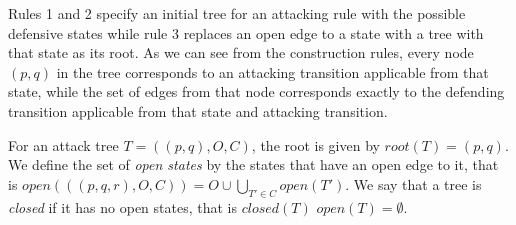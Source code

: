 \begin{definition}
  Rules 1 and 2 specify an initial tree for an attacking rule with the possible defensive
  states while rule 3 replaces an open edge to a state with a tree with that state as its
  root.
  As we can see from the construction rules, every node $(p,q)$ in the tree corresponds
  to an attacking transition applicable from that state, while the set of edges from that node
  corresponds exactly to the defending transition applicable from that state and attacking transition.

  For an attack tree $T = ((p,q),O,C)$, the root is given by $root(T) = (p,q)$.
  We define the set of \emph{open states} by the states that
  have an open edge to it, that is
  $open(((p,q,r), O, C)) = O ∪ ⋃_{T' ∈ C} open(T')$.
  We say that a tree is \emph{closed} if it has no open states, that is
  $closed(T)$ \iff $open(T) = ∅$.


  


\end{definition}

